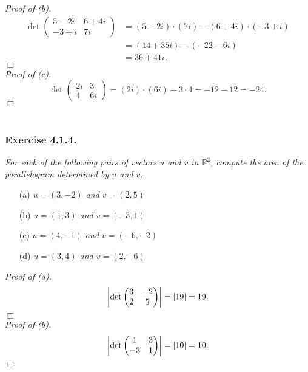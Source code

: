 \documentclass{article}
\begin{document}
\emph{Proof of (b).}
\begin{align*}
\det\begin{pmatrix}
5-2i & 6+4i \\
-3+i & 7i
\end{pmatrix}
&= (5-2i) \cdot (7i) - (6+4i) \cdot (-3+i) \\
&= (14+35i) - (-22-6i) \\
&= 36+41i.
\end{align*}
$\Box$ \\

\emph{Proof of (c).}
$$\det\begin{pmatrix}
2i & 3 \\
4 & 6i
\end{pmatrix}
= (2i) \cdot (6i) - 3 \cdot 4 = -12 - 12 = -24.$$
$\Box$ \\\\






\subsubsection*{Exercise 4.1.4.}
\emph{For each of the following pairs of vectors $u$ and $v$ in $\mathbb{R}^2$,
compute the area of the parallelogram determined by $u$ and $v$.}
\begin{enumerate}
\item[(a)]
\emph{$u = (3,-2)$ and $v=(2,5)$}
\item[(b)]
\emph{$u = (1,3)$ and $v=(-3,1)$}
\item[(c)]
\emph{$u = (4,-1)$ and $v=(-6,-2)$}
\item[(d)]
\emph{$u = (3,4)$ and $v=(2,-6)$} \\
\end{enumerate}

\emph{Proof of (a).}
$$\abs{\det\begin{pmatrix} 3 & -2 \\ 2 & 5 \end{pmatrix}}
= \abs{19} = 19.$$
$\Box$ \\

\emph{Proof of (b).}
$$\abs{\det\begin{pmatrix} 1 & 3 \\ -3 & 1 \end{pmatrix}}
= \abs{10} = 10.$$
$\Box$ \\
\end{document}
